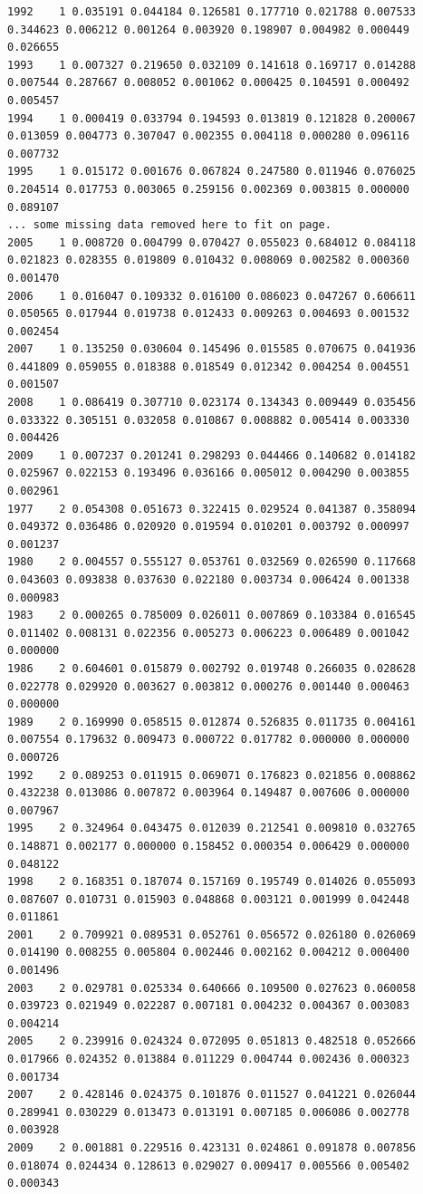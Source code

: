 \begin{landscape}
\begin{table}
\begin{scriptsize}
\begin{verbatim}
1992    1 0.035191 0.044184 0.126581 0.177710 0.021788 0.007533 0.344623 0.006212 0.001264 0.003920 0.198907 0.004982 0.000449 0.026655
1993    1 0.007327 0.219650 0.032109 0.141618 0.169717 0.014288 0.007544 0.287667 0.008052 0.001062 0.000425 0.104591 0.000492 0.005457
1994    1 0.000419 0.033794 0.194593 0.013819 0.121828 0.200067 0.013059 0.004773 0.307047 0.002355 0.004118 0.000280 0.096116 0.007732
1995    1 0.015172 0.001676 0.067824 0.247580 0.011946 0.076025 0.204514 0.017753 0.003065 0.259156 0.002369 0.003815 0.000000 0.089107
...	some missing data removed here to fit on page.
2005    1 0.008720 0.004799 0.070427 0.055023 0.684012 0.084118 0.021823 0.028355 0.019809 0.010432 0.008069 0.002582 0.000360 0.001470
2006    1 0.016047 0.109332 0.016100 0.086023 0.047267 0.606611 0.050565 0.017944 0.019738 0.012433 0.009263 0.004693 0.001532 0.002454
2007    1 0.135250 0.030604 0.145496 0.015585 0.070675 0.041936 0.441809 0.059055 0.018388 0.018549 0.012342 0.004254 0.004551 0.001507
2008    1 0.086419 0.307710 0.023174 0.134343 0.009449 0.035456 0.033322 0.305151 0.032058 0.010867 0.008882 0.005414 0.003330 0.004426
2009    1 0.007237 0.201241 0.298293 0.044466 0.140682 0.014182 0.025967 0.022153 0.193496 0.036166 0.005012 0.004290 0.003855 0.002961
1977    2 0.054308 0.051673 0.322415 0.029524 0.041387 0.358094 0.049372 0.036486 0.020920 0.019594 0.010201 0.003792 0.000997 0.001237
1980    2 0.004557 0.555127 0.053761 0.032569 0.026590 0.117668 0.043603 0.093838 0.037630 0.022180 0.003734 0.006424 0.001338 0.000983
1983    2 0.000265 0.785009 0.026011 0.007869 0.103384 0.016545 0.011402 0.008131 0.022356 0.005273 0.006223 0.006489 0.001042 0.000000
1986    2 0.604601 0.015879 0.002792 0.019748 0.266035 0.028628 0.022778 0.029920 0.003627 0.003812 0.000276 0.001440 0.000463 0.000000
1989    2 0.169990 0.058515 0.012874 0.526835 0.011735 0.004161 0.007554 0.179632 0.009473 0.000722 0.017782 0.000000 0.000000 0.000726
1992    2 0.089253 0.011915 0.069071 0.176823 0.021856 0.008862 0.432238 0.013086 0.007872 0.003964 0.149487 0.007606 0.000000 0.007967
1995    2 0.324964 0.043475 0.012039 0.212541 0.009810 0.032765 0.148871 0.002177 0.000000 0.158452 0.000354 0.006429 0.000000 0.048122
1998    2 0.168351 0.187074 0.157169 0.195749 0.014026 0.055093 0.087607 0.010731 0.015903 0.048868 0.003121 0.001999 0.042448 0.011861
2001    2 0.709921 0.089531 0.052761 0.056572 0.026180 0.026069 0.014190 0.008255 0.005804 0.002446 0.002162 0.004212 0.000400 0.001496
2003    2 0.029781 0.025334 0.640666 0.109500 0.027623 0.060058 0.039723 0.021949 0.022287 0.007181 0.004232 0.004367 0.003083 0.004214
2005    2 0.239916 0.024324 0.072095 0.051813 0.482518 0.052666 0.017966 0.024352 0.013884 0.011229 0.004744 0.002436 0.000323 0.001734
2007    2 0.428146 0.024375 0.101876 0.011527 0.041221 0.026044 0.289941 0.030229 0.013473 0.013191 0.007185 0.006086 0.002778 0.003928
2009    2 0.001881 0.229516 0.423131 0.024861 0.091878 0.007856 0.018074 0.024434 0.128613 0.029027 0.009417 0.005566 0.005402 0.000343
\end{verbatim}
\end{scriptsize}
\end{table}
\end{landscape}
